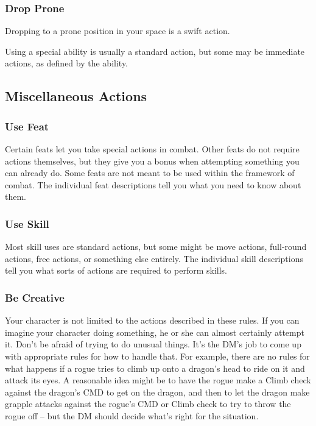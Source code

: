 \subsubsection{Drop Prone}
Dropping to a prone position in your space is a swift action.

Using a special ability is usually a standard action, but some may be immediate actions, as defined by the ability.

\subsection{Miscellaneous Actions}

\subsubsection{Use Feat}
Certain feats let you take special actions in combat. Other feats do not require actions themselves, but they give you a bonus when attempting something you can already do. Some feats are not meant to be used within the framework of combat. The individual feat descriptions tell you what you need to know about them.

\subsubsection{Use Skill}
Most skill uses are standard actions, but some might be move actions, full-round actions, free actions, or something else entirely. The individual skill descriptions tell you what sorts of actions are required to perform skills.

\subsubsection{Be Creative}
Your character is not limited to the actions described in these rules. If you can imagine your character doing something, he or she can almost certainly attempt it. Don't be afraid of trying to do unusual things. It's the DM's job to come up with appropriate rules for how to handle that. For example, there are no rules for what happens if a rogue tries to climb up onto a dragon's head to ride on it and attack its eyes. A reasonable idea might be to have the rogue make a Climb check against the dragon's CMD to get on the dragon, and then to let the dragon make grapple attacks against the rogue's CMD or Climb check to try to throw the rogue off -- but the DM should decide what's right for the situation.

